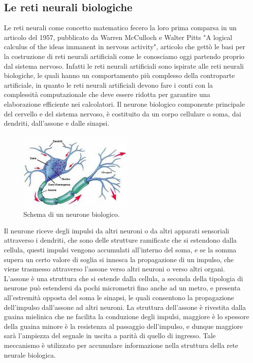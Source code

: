 \subsection{Le reti neurali biologiche}

Le reti neurali come concetto matematico fecero la loro prima comparsa in un articolo del 1957, pubblicato da Warren McCulloch e Walter Pitts
"A logical calculus of the ideas immanent in nervous activity", articolo che gettò le basi per la costruzione di reti neurali artificiali
come le conosciamo oggi partendo proprio dal sistema nervoso.
Infatti le reti neurali artificiali sono ispirate alle reti neurali biologiche, le quali hanno un comportamento più complesso della
controparte artificiale, in quanto le reti neurali artificiali devono fare i conti con la complessità computazionale che deve essere 
ridotta per garantire una elaborazione efficiente nei calcolatori.
Il neurone biologico componente principale del cervello e del sistema nervoso, è costituito da un corpo cellulare o soma, dai dendriti, 
dall'assone e dalle sinapsi.
    \begin{figure}[H]
        \centering
        \includegraphics[width=0.5\textwidth]{imgs/neurone.jpg}
        \caption{Schema di un neurone biologico.}
        \label{fig:neuron_bio}
    \end{figure}
Il neurone riceve degli impulsi da altri neuroni o da altri apparati sensoriali attraverso i dendriti, che sono delle strutture ramificate
che si estendono dalla cellula, questi impulsi vengono accumulati all'interno del soma, e se la somma supera un certo valore di soglia
si innesca la propagazione di un impulso, che viene trasmesso attraverso l'assone verso altri neuroni o verso altri organi.
L'assone è una struttura che si estende dalla cellula, a seconda della tipologia di neurone può estendersi da pochi micrometri fino anche ad un metro,
e presenta all'estremità opposta del soma le sinapsi, le quali consentono la propagazione dell'impulso dall'assone ad altri neuroni.
La struttura dell'assone è rivestita dalla guaina mielinica che ne facilita la conduzione degli impulsi, maggiore è lo spessore della guaina
minore è la resistenza al passaggio dell'impulso, e dunque maggiore sarà l'ampiezza del segnale in uscita a parità di quello di ingresso. 
Tale meccanismo è utilizzato per accumulare informazione nella struttura della rete neurale biologica.

